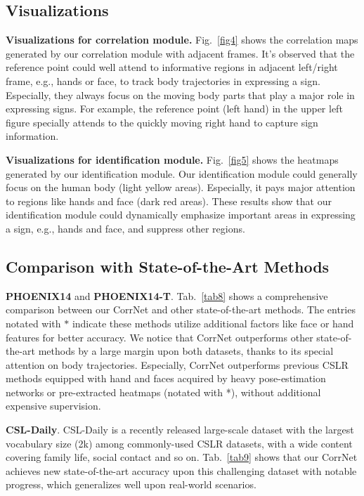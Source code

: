 \documentclass[10pt,twocolumn,letterpaper]{article}
\begin{document}
\subsection{Visualizations}
\textbf{Visualizations for correlation module.} Fig.~\ref{fig4} shows the correlation maps generated by our correlation module with adjacent frames. It's observed that the reference point could well attend to informative regions in adjacent left/right frame, e.g., hands or face, to track body trajectories in expressing a sign. Especially, they always focus on the moving body parts that play a major role in expressing signs. For example, the reference point (left hand) in the upper left figure specially attends to the quickly moving right hand to capture sign information.

\textbf{Visualizations for identification module.} Fig.~\ref{fig5} shows the heatmaps generated by our identification module. Our identification module could generally focus on the human body (light yellow areas). Especially, it pays major attention to regions like hands and face (dark red areas). These results show that our identification module could dynamically emphasize important areas in expressing a sign, e.g., hands and face, and suppress other regions. 

\subsection{Comparison with State-of-the-Art Methods}
\textbf{PHOENIX14} and \textbf{PHOENIX14-T}. Tab.~\ref{tab8} shows a comprehensive comparison between our CorrNet and other state-of-the-art methods. The entries notated with $*$ indicate these methods utilize additional factors like face or hand features for better accuracy. We notice that CorrNet outperforms other state-of-the-art methods by a large margin upon both datasets, thanks to its special attention on body trajectories. Especially, CorrNet outperforms previous CSLR methods equipped with hand and faces acquired by heavy pose-estimation networks or pre-extracted heatmaps (notated with *), without additional expensive supervision. 

\textbf{CSL-Daily}. CSL-Daily is a recently released large-scale dataset with the largest vocabulary size (2k) among commonly-used CSLR datasets, with a wide content covering family life, social contact and so on. Tab.~\ref{tab9} shows that our CorrNet achieves new state-of-the-art accuracy upon this challenging dataset with notable progress, which generalizes well upon real-world scenarios.
\end{document}
